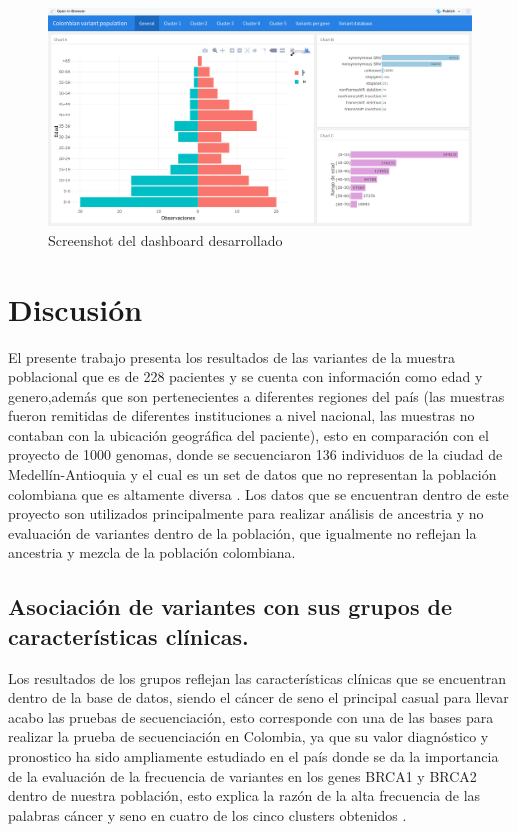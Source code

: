 \begin{figure}[H]
	\centering
	\includegraphics[width=1\textwidth]{Kap4/dash}
	\caption{Screenshot del dashboard desarrollado} \label{fig:dash}
\end{figure}

\section{Discusión}

El presente trabajo presenta los resultados de las variantes de la muestra poblacional que es de 228 pacientes y se cuenta con información como edad y genero,además que son pertenecientes a diferentes regiones del país (las muestras fueron remitidas de diferentes instituciones a nivel nacional, las muestras no contaban con la ubicación geográfica del paciente), esto en comparación con el proyecto de 1000 genomas, donde se secuenciaron 136 individuos de la ciudad de Medellín-Antioquia y el cual es un set de datos que no representan la población colombiana que es altamente diversa \cite{GabrielBedoya,Consortium2012}. Los datos que se encuentran dentro de este proyecto son utilizados principalmente para realizar análisis de ancestria \cite{Rishishwar2015a} y no evaluación de variantes dentro de la población, que igualmente no reflejan la ancestria y mezcla de la población colombiana. 

\subsection{Asociación de variantes con sus grupos de características clínicas.}

Los resultados de los grupos reflejan las características clínicas que se encuentran dentro de la base de datos, siendo el cáncer de seno el principal casual para llevar acabo las pruebas de secuenciación, esto corresponde con una de las bases para realizar la prueba de secuenciación en Colombia, ya que su valor diagnóstico y pronostico ha sido ampliamente estudiado en el país donde se da la importancia de la evaluación de la frecuencia de variantes en los genes BRCA1 y BRCA2 dentro de nuestra población, esto explica la razón de la alta frecuencia de las palabras cáncer y seno en cuatro de los cinco clusters obtenidos \cite{Ignacio2017,Arias-blanco2015}.\\

